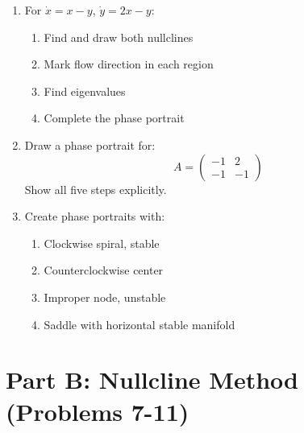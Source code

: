 \documentclass[12pt]{article}
\begin{document}
\begin{enumerate}
\item For $\dot{x} = x - y$, $\dot{y} = 2x - y$:
\begin{enumerate}[label=(\alph*)]
    \item Find and draw both nullclines
    \item Mark flow direction in each region
    \item Find eigenvalues
    \item Complete the phase portrait
\end{enumerate}

\item Draw a phase portrait for:
$$A = \begin{pmatrix} -1 & 2 \\ -1 & -1 \end{pmatrix}$$
Show all five steps explicitly.

\item Create phase portraits with:
\begin{enumerate}[label=(\alph*)]
    \item Clockwise spiral, stable
    \item Counterclockwise center
    \item Improper node, unstable
    \item Saddle with horizontal stable manifold
\end{enumerate}
\end{enumerate}

\section*{Part B: Nullcline Method (Problems 7-11)}
\end{document}
